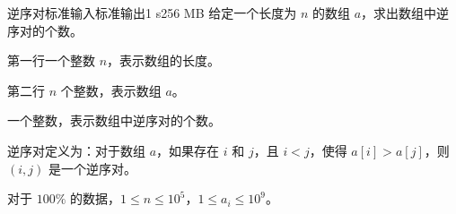 \begin{problem}{逆序对}{标准输入}{标准输出}{1 s}{256 MB}
给定一个长度为 $n$ 的数组 $a$，求出数组中逆序对的个数。

\InputFile
第一行一个整数 $n$，表示数组的长度。

第二行 $n$ 个整数，表示数组 $a$。

\OutputFile
一个整数，表示数组中逆序对的个数。

\Example

\begin{example}
\end{example}

\Note

逆序对定义为：对于数组 $a$，如果存在 $i$ 和 $j$，且 $i < j$，使得 $a[i] > a[j]$，则 $(i, j)$ 是一个逆序对。

\Constraints

对于 $100\%$ 的数据，$1 \leq n \leq 10 ^ 5$，$1 \leq a_i \leq 10 ^ 9$。

\end{problem}

